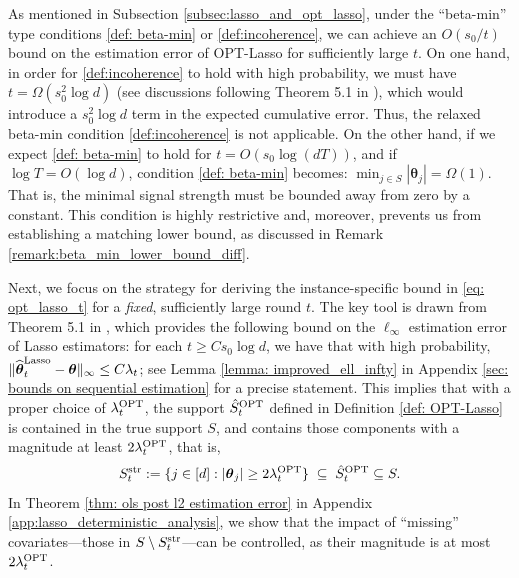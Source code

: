\documentclass[aos,preprint]{imsart}
\theoremstyle{plain}
\theoremstyle{definition}
\newcommand{\btheta}{\boldsymbol{\theta}}
\newcommand{\hbtheta}{\widehat{\boldsymbol{\theta}}}
\newcommand{\ltheta}{\hbtheta^{\textup{Lasso}}}
\newcommand{\hdlambda}{\lambda^{\textup{OPT}}}
\newcommand{\pS}{\hat{S}^{\textup{OPT}}}
\begin{document}
As mentioned in Subsection \ref{subsec:lasso_and_opt_lasso}, under the ``beta-min'' type conditions \eqref{def: beta-min} or \eqref{def:incoherence}, we can achieve an $O(s_0/t)$ bound on the estimation error of OPT-Lasso for sufficiently large $t$. On one hand, in order for \eqref{def:incoherence} to hold with high probability, we must have $t = \Omega(s_0^2\log d)$ (see discussions following Theorem 5.1 in \cite{bellec2022biasing}), which would introduce a $s_0^2 \log d$ term in the expected cumulative error. Thus, the relaxed beta-min condition \eqref{def:incoherence} is not applicable.
On the other hand, if we expect \eqref{def: beta-min} 
 to hold for $t = O(s_0\log(dT))$, and if $\log T = O(\log d)$, condition \eqref{def: beta-min} becomes: $  \min_{j \in S} |\btheta_j| = \Omega(1)$. 
That is, the minimal signal strength must be bounded away from zero by a constant. This condition is highly restrictive and, moreover, prevents us from establishing a matching lower bound, as discussed in Remark \ref{remark:beta_min_lower_bound_diff}.


Next, we focus on the strategy for deriving the instance-specific bound in \eqref{eq: opt_lasso_t} for a \textit{fixed}, sufficiently large round $t$. 
The key tool is drawn from Theorem 5.1 in \cite{bellec2022biasing}, which provides the following bound on the $\ell_{\infty}$ estimation error of Lasso estimators: for each $t \geq C s_0\log d$, we have that with high probability, $\|\ltheta_t -\btheta \|_{\infty} \le C\lambda_t$;
see Lemma \ref{lemma: improved_ell_infty} in Appendix  \ref{sec: bounds on sequential estimation} for a precise statement. This implies that with a proper choice of $\hdlambda_t$, the support $\pS_t$ defined in Definition \ref{def: OPT-Lasso} is contained in the true support $S$, and contains those components with a magnitude at least $2\hdlambda_t$, that is,
\begin{align}\label{OPT_Lasso_selection_prop}
  S_t^{\textup{str}} := \{j\in[d]: |\btheta_j|\ge 2\hdlambda_t\} \;\subseteq \;   \pS_t \subseteq S.
\end{align}
In Theorem \ref{thm: ols post l2 estimation error} in Appendix  \ref{app:lasso_deterministic_analysis}, we show that the impact of  ``missing'' covariates---those in $S\setminus S_t^{\textup{str}}$---can be controlled, as their magnitude is at most $2\hdlambda_t$. 
\end{document}
